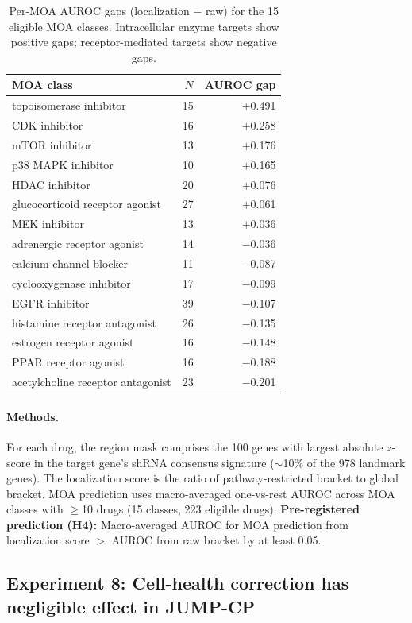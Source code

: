 \documentclass{article}
\begin{document}
\begin{table}[h]
\centering
\caption{Per-MOA AUROC gaps (localization $-$ raw) for the 15 eligible MOA
classes. Intracellular enzyme targets show positive gaps; receptor-mediated
targets show negative gaps.}
\label{tab:loc_moa}
\small
\begin{tabular}{lrr}
\toprule
MOA class & $N$ & AUROC gap \\
\midrule
topoisomerase inhibitor & 15 & $+$0.491 \\
CDK inhibitor & 16 & $+$0.258 \\
mTOR inhibitor & 13 & $+$0.176 \\
p38 MAPK inhibitor & 10 & $+$0.165 \\
HDAC inhibitor & 20 & $+$0.076 \\
glucocorticoid receptor agonist & 27 & $+$0.061 \\
MEK inhibitor & 13 & $+$0.036 \\
\midrule
adrenergic receptor agonist & 14 & $-$0.036 \\
calcium channel blocker & 11 & $-$0.087 \\
cyclooxygenase inhibitor & 17 & $-$0.099 \\
EGFR inhibitor & 39 & $-$0.107 \\
histamine receptor antagonist & 26 & $-$0.135 \\
estrogen receptor agonist & 16 & $-$0.148 \\
PPAR receptor agonist & 16 & $-$0.188 \\
acetylcholine receptor antagonist & 23 & $-$0.201 \\
\bottomrule
\end{tabular}
\end{table}

\paragraph{Methods.}
For each drug, the region mask comprises the 100 genes with largest absolute
$z$-score in the target gene's shRNA consensus signature ($\sim$10\% of the
978 landmark genes). The localization score is the ratio of pathway-restricted
bracket to global bracket. MOA prediction uses macro-averaged one-vs-rest
AUROC across MOA classes with $\geq$10 drugs (15 classes, 223 eligible drugs).
\textbf{Pre-registered prediction (H4):} Macro-averaged AUROC for MOA
prediction from localization score $>$ AUROC from raw bracket by at least
0.05.

\subsection{Experiment 8: Cell-health correction has negligible effect in JUMP-CP}
\end{document}
